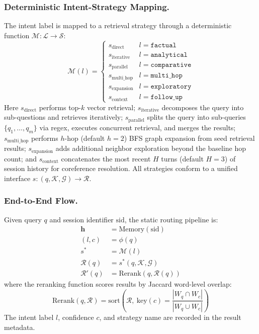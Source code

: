 \documentclass[runningheads]{llncs}
\begin{document}
\subsubsection{Deterministic Intent-Strategy Mapping.}

The intent label is mapped to a retrieval strategy through a deterministic function $\mathcal{M}: \mathcal{L} \to \mathcal{S}$:
\begin{equation}
    \mathcal{M}(l) = \begin{cases}
    s_{\text{direct}} & l = \texttt{factual} \\
    s_{\text{iterative}} & l = \texttt{analytical} \\
    s_{\text{parallel}} & l = \texttt{comparative} \\
    s_{\text{multi\_hop}} & l = \texttt{multi\_hop} \\
    s_{\text{expansion}} & l = \texttt{exploratory} \\
    s_{\text{context}} & l = \texttt{follow\_up}
    \end{cases}
\end{equation}
Here $s_{\text{direct}}$ performs top-$k$ vector retrieval; $s_{\text{iterative}}$ decomposes the query into sub-questions and retrieves iteratively; $s_{\text{parallel}}$ splits the query into sub-queries $\{q_1, \ldots, q_m\}$ via regex, executes concurrent retrieval, and merges the results; $s_{\text{multi\_hop}}$ performs $h$-hop (default $h=2$) BFS graph expansion from seed retrieval results; $s_{\text{expansion}}$ adds additional neighbor exploration beyond the baseline hop count; and $s_{\text{context}}$ concatenates the most recent $H$ turns (default $H=3$) of session history for coreference resolution. All strategies conform to a unified interface $s: (q, \mathcal{K}, \mathcal{G}) \to \mathcal{R}$.

\subsubsection{End-to-End Flow.}

Given query $q$ and session identifier $\text{sid}$, the static routing pipeline is:
\begin{equation}
    \begin{aligned}
    \mathbf{h} &= \text{Memory}(\text{sid}) \\
    (l, c) &= \phi(q) \\
    s^* &= \mathcal{M}(l) \\
    \mathcal{R}(q) &= s^*(q, \mathcal{K}, \mathcal{G}) \\
    \mathcal{R}'(q) &= \text{Rerank}(q, \mathcal{R}(q))
    \end{aligned}
\end{equation}
where the reranking function scores results by Jaccard word-level overlap:
\begin{equation}
    \text{Rerank}(q, \mathcal{R}) = \text{sort}\!\left(\mathcal{R},\ \text{key}(c) = \frac{|W_q \cap W_c|}{|W_q \cup W_c|}\right)
\end{equation}
The intent label $l$, confidence $c$, and strategy name are recorded in the result metadata.
\end{document}
